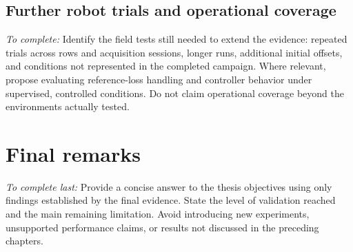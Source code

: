 \subsection{Further robot trials and operational coverage}
\label{subsec:c6_future_field}

\emph{To complete:} Identify the field tests still needed to extend the
evidence: repeated trials across rows and acquisition sessions, longer
runs, additional initial offsets, and conditions not represented in the
completed campaign. Where relevant, propose evaluating reference-loss
handling and controller behavior under supervised, controlled conditions.
Do not claim operational coverage beyond the environments actually tested.

\section{Final remarks}
\label{sec:c6_final_remarks}

\emph{To complete last:} Provide a concise answer to the thesis objectives
using only findings established by the final evidence. State the level
of validation reached and the main remaining limitation. Avoid introducing
new experiments, unsupported performance claims, or results not discussed
in the preceding chapters.